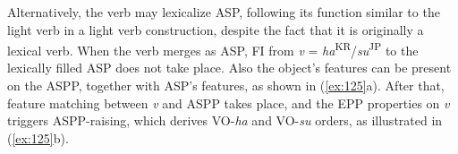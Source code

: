 \ea\label{ex:124}
    \ea{}
    \ex{}
    \ex{}
    \z
\z

Alternatively, the verb may lexicalize \ac{ASP}, following its function similar to the light verb in a light verb construction, despite the fact that it is originally a lexical verb. When the verb merges as \ac{ASP}, \ac{FI} from \textit{v} = \textit{ha}\textsuperscript{\MakeUppercase{kr}}/\textit{su}\textsuperscript{\MakeUppercase{jp}}\MakeUppercase{} to the lexically filled \ac{ASP} does not take place. Also the object’s features can be present on the \ac{ASP}P, together with \ac{ASP}’s features, as shown in (\ref{ex:125}a). After that, feature matching between \textit{v} and \ac{ASP}P takes place, and the \ac{EPP} properties on \textit{v} triggers \ac{ASP}P-raising, which derives \ac{VO}-\textit{ha} and \ac{VO}-\textit{su} orders, as illustrated in (\ref{ex:125}b). 

